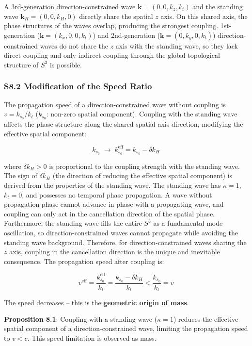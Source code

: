 \documentclass[
  a4paper,11pt]{article}
\theoremstyle{definition}
\theoremstyle{remark}
\begin{document}
A 3rd-generation direction-constrained wave
\(\mathbf{k} = (0, 0, k_z, k_t)\) and the standing wave
\(\mathbf{k}_H = (0, 0, k_H, 0)\) directly share the spatial \(z\) axis.
On this shared axis, the phase structures of the waves overlap,
producing the strongest coupling. 1st-generation
(\(\mathbf{k} = (k_x, 0, 0, k_t)\)) and 2nd-generation
(\(\mathbf{k} = (0, k_y, 0, k_t)\)) direction-constrained waves do not
share the \(z\) axis with the standing wave, so they lack direct
coupling and only indirect coupling through the global topological
structure of \(S^3\) is possible.

\subsubsection{S8.2 Modification of the Speed
Ratio}\label{s8.2-modification-of-the-speed-ratio}

The propagation speed of a direction-constrained wave without coupling
is \(v = k_{s_0} / k_t\) (\(k_{s_0}\): non-zero spatial component).
Coupling with the standing wave affects the phase structure along the
shared spatial axis direction, modifying the effective spatial
component:

\[k_{s_0} \;\longrightarrow\; k_{s_0}^{\text{eff}} = k_{s_0} - \delta k_H\]

where \(\delta k_H > 0\) is proportional to the coupling strength with
the standing wave. The sign of \(\delta k_H\) (the direction of reducing
the effective spatial component) is derived from the properties of the
standing wave. The standing wave has \(\kappa = 1\), \(k_t = 0\), and
possesses no temporal phase propagation. A wave without propagation
phase cannot advance in phase with a propagating wave, and coupling can
only act in the cancellation direction of the spatial phase.
Furthermore, the standing wave fills the entire \(S^3\) as a fundamental
mode oscillation, so direction-constrained waves cannot propagate while
avoiding the standing wave background. Therefore, for
direction-constrained waves sharing the \(z\) axis, coupling in the
cancellation direction is the unique and inevitable consequence. The
propagation speed after coupling is:

\[v^{\text{eff}} = \frac{k_{s_0}^{\text{eff}}}{k_t} = \frac{k_{s_0} - \delta k_H}{k_t} < \frac{k_{s_0}}{k_t} = v\]

The speed decreases -- this is the \textbf{geometric origin of mass}.

\textbf{Proposition 8.1}: Coupling with a standing wave (\(\kappa = 1\))
reduces the effective spatial component of a direction-constrained wave,
limiting the propagation speed to \(v < c\). This speed limitation is
observed as mass.
\end{document}
